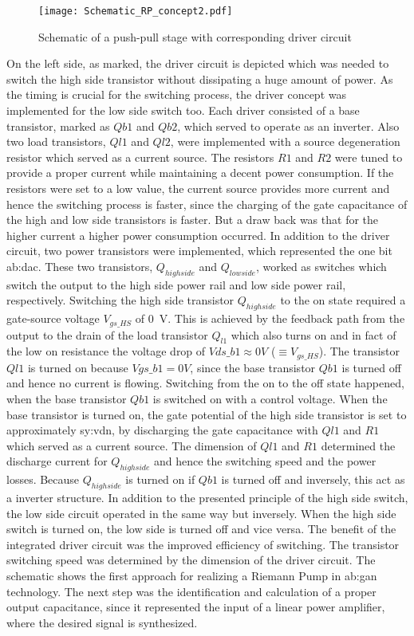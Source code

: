 \begin{figure}[ht]
	\centering
  \texttt{[image: Schematic\_RP\_concept2.pdf]}
	\caption{Schematic of a push-pull stage with corresponding driver circuit}
	\label{fig:SchematicRiemannPump}
\end{figure}

On the left side, as marked, the driver circuit is depicted which was needed to switch the high side transistor without dissipating a huge amount of power.
As the timing is crucial for the switching process, the driver concept was implemented for the low side switch too.
Each driver consisted of a base transistor, marked as $Qb1$ and $Qb2$, which served to operate as an inverter.
Also two load transistors, $Ql1$ and $Ql2$, were implemented with a source degeneration resistor which served as a current source.
The resistors $R1$ and $R2$ were tuned to provide a proper current while maintaining a decent power consumption.
If the resistors were set to a low value, the current source provides more current and hence the switching process is faster, since the charging of the gate capacitance of the high and low side transistors is faster.
But a draw back was that for the higher current a higher power consumption occurred.
In addition to the driver circuit, two power transistors were implemented, which represented the one bit \gls{ab:dac}.
These two transistors, $Q_{highside}$ and $Q_{lowside}$, worked as switches which switch the output to the high side power rail and low side power rail, respectively.
Switching the high side transistor $Q_{highside}$ to the on state required a gate-source voltage $V_{gs\_HS}$ of \SI{0}{\volt}.
This is achieved by the feedback path from the output to the drain of the load transistor $Q_{l1}$ which also turns on and in fact of the low on resistance the voltage drop of $Vds\_b1 \approx 0 V$ ($\equiv V_{gs\_HS}$).
The transistor $Ql1$ is turned on because $Vgs\_b1 = 0 V$, since the base transistor $Qb1$ is turned off and hence no current is flowing.
Switching from the on to the off state happened, when the base transistor $Qb1$ is switched on with a control voltage.
When the base transistor is turned on, the gate potential of the high side transistor is set to approximately \gls{sy:vdn}, by discharging the gate capacitance with $Ql1$ and $R1$ which served as a current source.
The dimension of $Ql1$ and $R1$ determined the discharge current for $Q_{highside}$ and hence the switching speed and the power losses.
Because $Q_{highside}$ is turned on if $Qb1$ is turned off and inversely, this act as a inverter structure.
In addition to the presented principle of the high side switch, the low side circuit operated in the same way but inversely.
When the high side switch is turned on, the low side is turned off and vice versa.
The benefit of the integrated driver circuit was the improved efficiency of switching.
The transistor switching speed was determined by the dimension of the driver circuit.
The schematic shows the first approach for realizing a Riemann Pump in \gls{ab:gan} technology.
The next step was the identification and calculation of a proper output capacitance, since it represented the input of a linear power amplifier, where the desired signal is synthesized.
 
